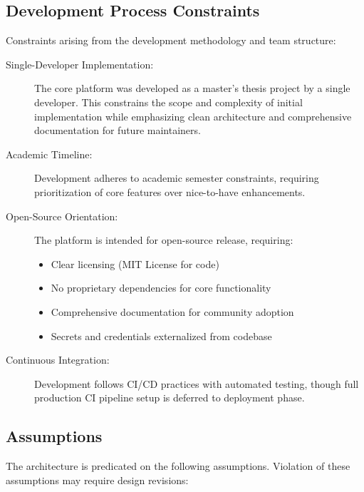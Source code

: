 \documentclass[a4paper,twoside]{sapthesis}
\begin{document}
\subsection{Development Process Constraints}
\label{subsec:development-constraints}

Constraints arising from the development methodology and team structure:

\begin{description}
    \item[Single-Developer Implementation:] The core platform was developed as a master's thesis project by a single developer. This constrains the scope and complexity of initial implementation while emphasizing clean architecture and comprehensive documentation for future maintainers.
    
    \item[Academic Timeline:] Development adheres to academic semester constraints, requiring prioritization of core features over nice-to-have enhancements.
    
    \item[Open-Source Orientation:] The platform is intended for open-source release, requiring:
    \begin{itemize}
        \item Clear licensing (MIT License for code)
        \item No proprietary dependencies for core functionality
        \item Comprehensive documentation for community adoption
        \item Secrets and credentials externalized from codebase
    \end{itemize}
    
    \item[Continuous Integration:] Development follows CI/CD practices with automated testing, though full production CI pipeline setup is deferred to deployment phase.
\end{description}

\subsection{Assumptions}
\label{subsec:assumptions}

The architecture is predicated on the following assumptions. Violation of these assumptions may require design revisions:
\end{document}

